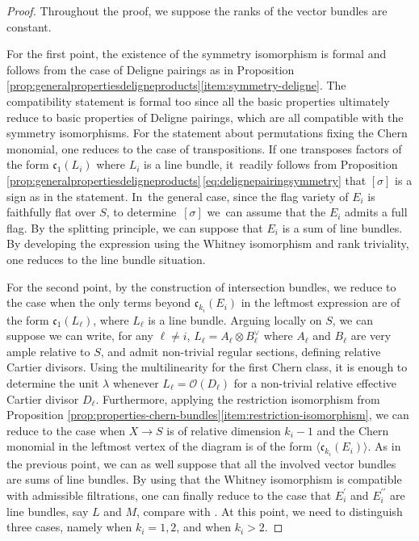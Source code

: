 \documentclass[JEP,XML,SOM,Unicode,published]{cedram}
\theoremstyle{plain}
\theoremstyle{definition}
\newcommand{\Ocal}{\mathcal O}
\newcommand{\cfrak}{\mathfrak c}
\newcommand{\bis}{\prime\prime}
\begin{document}
\begin{proof}
Throughout the proof, we suppose the ranks of the vector bundles are constant.

For the first point, the existence of the symmetry isomorphism is formal and follows from the case of Deligne pairings as in Proposition \ref{prop:generalpropertiesdeligneproducts}\eqref{item:symmetry-deligne}. The compatibility statement is formal too since all the basic properties ultimately reduce to basic properties of Deligne pairings, which are all compatible with the symmetry isomorphisms. For the statement about permutations fixing the Chern monomial, one reduces to the case of transpositions. If one transposes factors of the form $\cfrak_1(L_{i})$ where $L_{i}$ is a line bundle, it~readily follows from Proposition \ref{prop:generalpropertiesdeligneproducts}\,\eqref{eq:delignepairingsymmetry} that $[\sigma]$ is a sign as in the statement. In~the general case, since the flag variety of $E_i$ is faithfully flat over $S$, to determine~$[\sigma]$ we~can assume that the $E_i$ admits a full flag. By the splitting principle, we can suppose that $E_i$ is a sum of line bundles. By developing the expression using the Whitney isomorphism and rank triviality, one reduces to the line bundle situation.

For the second point, by the construction of intersection bundles, we reduce to the case when the only terms beyond $\cfrak_{k_{i}}(E_i)$ in the leftmost expression are of the form $\cfrak_1(L_\ell)$, where $L_\ell$ is a line bundle. Arguing locally on $S$, we can suppose we can write, for any $\ell \neq i$, $L_\ell = A_\ell \otimes B_\ell^{\vee}$ where $A_\ell$ and $B_\ell$ are very ample relative to $S$, and admit non-trivial regular sections, defining relative Cartier divisors. Using the multilinearity for the first Chern class, it is enough to determine the unit $\lambda$ whenever $L_\ell = \Ocal(D_{\ell})$ for a non-trivial relative effective Cartier divisor $D_\ell$. Furthermore, applying the restriction isomorphism from Proposition \ref{prop:properties-chern-bundles}\eqref{item:restriction-isomorphism}, we can reduce to the case when $X\to S$ is of relative dimension $k_{i}-1$ and the Chern monomial in the leftmost vertex of the diagram is of the form $\langle \cfrak_{k_{i}}(E_i) \rangle$. As in the previous point, we can as well suppose that all the involved vector bundles are sums of line bundles. By using that the Whitney isomorphism is compatible with admissible filtrations, one can finally reduce to the case that $E_{i}^{\prime}$ and $E_{i}^{\bis}$ are line bundles, say $L$ and $M$, compare with \cite[Cor.\,2.20]{Eriksson-Freixas-Wentworth}. At this point, we need to distinguish three cases, namely when $k_i = 1, 2$, and when $k_i>2$.


\end{proof}
\end{document}

